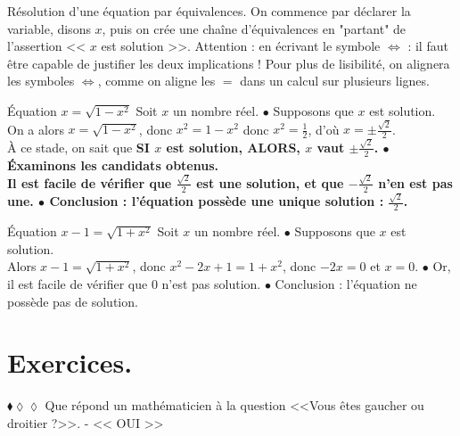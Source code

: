 \documentclass[11pt]{article}
\begin{document}
\begin{meth}{Résolution d'une équation par équivalences.}{}
    On commence par déclarer la variable, disons $x$, puis on crée une chaîne d'équivalences en "partant" de l'assertion << $x$ est solution >>.\n
    Attention : en écrivant le symbole $\iff$ : il faut être capable de justifier les deux implications !\n
    Pour plus de lisibilité, on alignera les symboles $\iff$, comme on aligne les $=$ dans un calcul sur plusieurs lignes.
\end{meth}

\begin{ex}{Équation $x=\sqrt{1-x^2}$}{}
    Soit $x$ un nombre réel.\n
    $\bullet$ Supposons que $x$ est solution.\\
    On a alors $x=\sqrt{1-x^2}$, donc $x^2=1-x^2$ donc $x^2=\frac{1}{2}$, d'où $x=\pm\frac{\sqrt{2}}{2}$.\\
    À ce stade, on sait que \bf{SI} $x$ est solution, \bf{ALORS}, $x$ vaut $\pm\frac{\sqrt{2}}{2}$.\n
    $\bullet$ Éxaminons les candidats obtenus.\\
    Il est facile de vérifier que $\frac{\sqrt{2}}{2}$ est une solution, et que $-\frac{\sqrt{2}}{2}$ n'en est pas une.\n
    $\bullet$ Conclusion : l'équation possède une unique solution : $\frac{\sqrt{2}}{2}$.
\end{ex}

\vspace*{-0.8cm}

\begin{ex}{Équation $x-1=\sqrt{1+x^2}$}{}
    Soit $x$ un nombre réel.\n
    $\bullet$ Supposons que $x$ est solution.\\
    Alors $x-1=\sqrt{1+x^2}$, donc $x^2-2x+1=1+x^2$, donc $-2x=0$ et $x=0$.\n
    $\bullet$ Or, il est facile de vérifier que 0 n'est pas solution.\n
    $\bullet$ Conclusion : l'équation ne possède pas de solution.
\end{ex}

\section{Exercices.}

\begin{exercice}{$\blacklozenge\lozenge\lozenge$}{}
    Que répond un mathématicien à la question <<Vous êtes gaucher ou droitier ?>>.
    \tcblower
    - << OUI >>
\end{exercice}

\vspace*{-0.8cm}
\end{document}
